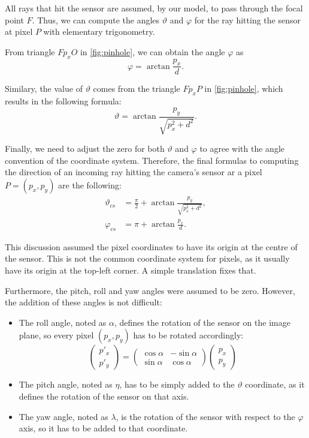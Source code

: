 All rays that hit the sensor are assumed, by our model, to pass through the focal point $F$. Thus, we can compute the angles $\vartheta$ and $\varphi$ for the ray hitting the sensor at pixel $P$ with elementary trigonometry.

From triangle $Fp_xO$ in \autoref{fig:pinhole}, we can obtain the angle $\varphi$ as
\[
	\varphi = \arctan{\frac{p_x}{d}}.
\]

Similary, the value of $\vartheta$ comes from the triangle $Fp_xP$ in \autoref{fig:pinhole}, which results in the following formula:
\[
	\vartheta = \arctan{\frac{p_y}{\sqrt{p_x^2 + d^2}}}.
\]

Finally, we need to adjust the zero for both $\vartheta$ and $\varphi$ to agree with the angle convention of the coordinate system. Therefore, the final formulas to computing the direction of an incoming ray hitting the camera's sensor ar a pixel $P = (p_x, p_y)$ are the following:
\begin{align}
	\vartheta_{cs} &= \frac{\pi}{2} + \arctan{\frac{p_y}{\sqrt{p_x^2 + d^2}}}, \\
	\varphi_{cs} &= \pi + \arctan{\frac{p_x}{d}}.
\end{align}

This discussion assumed the pixel coordinates to have its origin at the centre of the sensor. This is not the common coordinate system for pixels, as it usually have its origin at the top-left corner. A simple translation fixes that.

Furthermore, the pitch, roll and yaw angles were assumed to be zero. However, the addition of these angles is not difficult:
\begin{itemize}
	\item The roll angle, noted as $\alpha$, defines the rotation of the sensor on the image plane, so every pixel $(p_x, p_y)$ has to be rotated accordingly:
	\[
		\begin{pmatrix}
			p'_x \\
			p'_y
		\end{pmatrix} = 
		\begin{pmatrix}
			\cos\alpha & -\sin\alpha \\
			\sin\alpha & \cos\alpha 
		\end{pmatrix}
		\begin{pmatrix}
			p_x \\
			p_y
		\end{pmatrix}
	\]
	\item The pitch angle, noted as $\eta$, has to be simply added to the $\vartheta$ coordinate, as it defines the rotation of the sensor on that axis.
	\item The yaw angle, noted as $\lambda$, is the rotation of the sensor with respect to the $\varphi$ axis, so it has to be added to that coordinate.	
\end{itemize}

